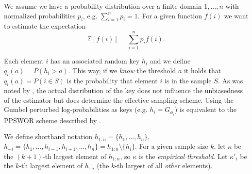 We assume we have a probability distribution over a finite domain $1, ..., n$ with normalized probabilities $p_i$, e.g. $\sum_{i=1}^n p_i = 1$. For a given function $f(i)$ we want to estimate the expectation
\begin{equation*}
    \mathbb{E}[f(i)] = \sum_{i=1}^n p_i f(i).
\end{equation*}

Each element $i$ has an associated random key $h_i$ and we define $q_i(a) = P(h_i > a)$. This way, if we \emph{know} the threshold $a$ it holds that $q_i(a) = P(i \in S)$ is the probability that element $i$ is in the sample $S$. As was noted by \citet{vieira2017estimating}, the actual distribution of the key does not influence the unbiasedness of the estimator but does determine the effective sampling scheme. Using the Gumbel perturbed log-probabilities as keys (e.g. $h_i = G_{\phi_i}$) is equivalent to the PPSWOR scheme described by \citet{vieira2017estimating}.

We define shorthand notation $h_{1:n} = \{h_1, ..., h_n\}$, $h_{-i} = \{h_1, ..., h_{i-1}, h_{i+1}, ..., h_n\} = h_{1:n} \setminus \{h_i\}$. For a given sample size $k$, let $\kappa$ be the $(k+1)$-th largest element of $h_{1:n}$, so $\kappa$ is the \emph{empirical threshold}. Let $\kappa'_i$ be the $k$-th largest element of $h_{-i}$ (the $k$-th largest of all \emph{other} elements).

